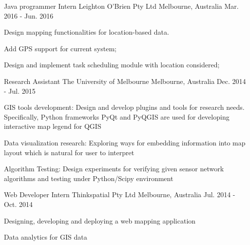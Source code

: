 

\begin{cventries}
\cventry
{Java programmer Intern}
{Leighton O’Brien Pty Ltd}
{Melbourne, Australia}
{Mar. 2016 - Jun. 2016}
{
\begin{cvitems}
\item{Design mapping functionalities for location-based data.}
\item{Add GPS support for current system;}
\item{Design and implement task scheduling module with location
considered;}
\end{cvitems}
}

\cventry
{Research Assistant}
{The University of Melbourne}
{Melbourne, Australia}
{Dec. 2014 - Jul. 2015}
{
\begin{cvitems}
\item{GIS tools development: Design and develop plugins and
tools for research needs. Specifically, Python frameworks
PyQt and PyQGIS are used for developing interactive map
legend for QGIS}
\item{Data visualization research: Exploring ways for embedding
information into map layout which is natural for user to
interpret}
\item{Algorithm Testing: Design experiments for verifying given sensor network algorithms and testing under Python/Scipy environment}
\end{cvitems}
}

\cventry
{Web Developer Intern} %
{Thinkspatial Pty Ltd} %
{Melbourne, Australia} %
{Jul. 2014 - Oct. 2014} %
{ %
\begin{cvitems}
\item {Designing, developing and deploying a web mapping
application}
\item {Data analytics for GIS data}
\end{cvitems}
}





\end{cventries}